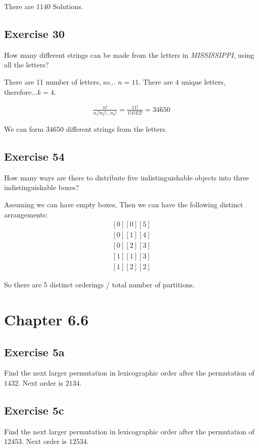 \documentclass[12pt]{article}
\begin{document}
    There are $1140$ Solutions.

    \subsection{Exercise 30} 
    How many different strings can be made from the letters in \textit{MISSISSIPPI}, using all the letters?

    There are 11 number of letters, so... $n=11$. 
    There are 4 unique letters, therefore...$k=4$.

    \begin{equation}
        \begin{split}
            \frac{n!}{n_1!n_2!...n_k!}=\frac{11!}{1!4!4!2!}=34650
        \end{split}
    \end{equation}

    We can form $34650$ different strings from the letters.

    \subsection{Exercise 54}
    How many ways are there to distribute five indistinguishable objects into three indistinguishable boxes?

    Assuming we can have empty boxes, Then we can have the following distinct arrangements:
    \begin{equation}
        \begin{split}
            [0][0][5]\\
            [0][1][4]\\
            [0][2][3]\\
            [1][1][3]\\
            [1][2][2]
        \end{split}
    \end{equation}

    So there are 5 distinct orderings / total number of partitions.

    \section{Chapter 6.6} 
    \subsection{Exercise 5a}
    Find the next larger permutation in lexicographic order after the permutation of $1432$.
    Next order is $2134$.


    \subsection{Exercise 5c}
    Find the next larger permutation in lexicographic order after the permutation of $12453$.
    Next order is $12534$.
\end{document}
